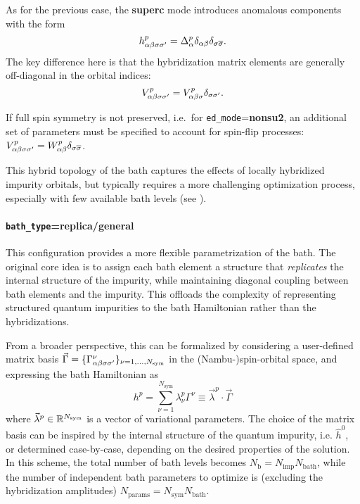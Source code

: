 \documentclass[edipack2.tex]{subfiles}
\begin{document}
As for the previous case, the {\bf superc} mode introduces anomalous
components with the form
$$
h^p_{\alpha\beta\sigma\sigma'}=\Delta^p_{\alpha}\delta_{\alpha\beta}\delta_{\sigma
  \overline{\sigma}}.
$$
The key difference here is that the hybridization matrix elements are
generally off-diagonal in the orbital indices:
$$
V^p_{\alpha\beta\sigma\sigma'}=V^p_{\alpha\beta\sigma}\delta_{\sigma\sigma'}.
$$

If full spin symmetry is not preserved, i.e.~for {\tt ed\_mode}={\bf nonsu2}, an additional
set of parameters must be specified to account for spin-flip processes:
$V^p_{\alpha\beta\sigma\sigma'} = W^p_{\alpha\beta}\delta_{\sigma \overline{\sigma}}$. 

This hybrid topology of the bath captures the effects of locally
hybridized impurity orbitals, but typically requires a more
challenging optimization process, especially
with few available bath levels (see ). 

\paragraph{{\tt bath\_type}={\bf replica}/{\bf general}}
This configuration provides a more flexible parametrization of the 
bath. The original core idea \cite{Capone2004PRB,Civelli2006}
is to assign each bath element a structure 
that {\it replicates} the internal structure of the impurity, while 
maintaining diagonal coupling between bath elements and the impurity. 
This offloads the complexity of representing structured quantum 
impurities to the bath Hamiltonian rather than the hybridizations.

From a broader perspective, this can be formalized by considering  
a user-defined matrix basis
$\vec{\Gamma}=\{ \Gamma^\nu_{\alpha\beta\sigma\sigma'} \}_{\nu=1,\dots,N_\mathrm{sym}}$ in the (Nambu-)spin-orbital
space, and expressing the bath Hamiltonian as
$$
h^p = \sum_{\nu=1}^{N_\mathrm{sym}} \lambda^p_\nu
\Gamma^\nu\equiv \vec{\lambda}^p\cdot \vec{\Gamma}
$$
where $\vec{\lambda}^p\in\mathbb{R}^{N_\mathrm{sym}}$ is a vector of variational parameters. 
The choice of the matrix basis can be inspired by the internal structure
of the quantum impurity, i.e. $\hat{h}^0$, or determined
case-by-case, depending on the desired properties of the solution.
In this scheme, the total number of bath levels becomes $N_\mathrm{b}
= N_\mathrm{imp} N_\mathrm{bath}$, while the number of independent bath
parameters to optimize is (excluding the hybridization amplitudes)
$N_\mathrm{params} = N_\mathrm{sym} N_\mathrm{bath}$.
\end{document}
